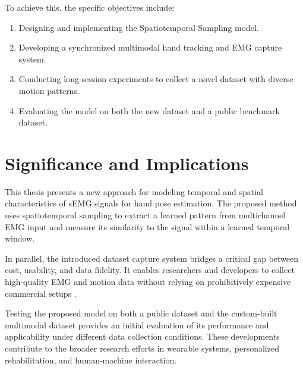 To achieve this, the specific objectives include:
\begin{enumerate}
    \item Designing and implementing the Spatiotemporal Sampling model.
    \item Developing a synchronized multimodal hand tracking and EMG capture system.
    \item Conducting long-session experiments to collect a novel dataset with diverse motion patterns.
    \item Evaluating the model on both the new dataset and a public benchmark dataset.
\end{enumerate}

\section{Significance and Implications}

This thesis presents a new approach for modeling temporal and spatial characteristics of sEMG signals for hand pose estimation. The proposed method uses spatiotemporal sampling to extract a learned pattern from multichannel EMG input and measure its similarity to the signal within a learned temporal window.

In parallel, the introduced dataset capture system bridges a critical gap between cost, usability, and data fidelity. It enables researchers and developers to collect high-quality EMG and motion data without relying on prohibitively expensive commercial setups \cite{quivira2018translating}.

Testing the proposed model on both a public dataset and the custom-built multimodal dataset provides an initial evaluation of its performance and applicability under different data collection conditions. These developments contribute to the broader research efforts in wearable systems, personalized rehabilitation, and human-machine interaction.
